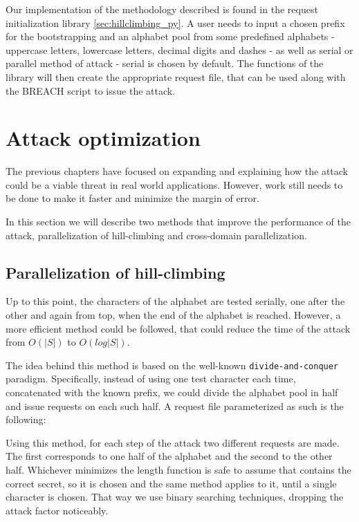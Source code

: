 Our implementation of the methodology described is found in the request
initialization library \ref{sec:hillclimbing_py}. A user needs to input a chosen
prefix for the bootstrapping and an alphabet pool from some predefined alphabets
- uppercase letters, lowercase letters, decimal digits and dashes - as well as
serial or parallel method of attack - serial is chosen by default. The
functions of the library will then create the appropriate request file, that
can be used along with the BREACH script to issue the attack.

\section{Attack optimization}\label{sec:optimization}

The previous chapters have focused on expanding and explaining how the attack
could be a viable threat in real world applications. However, work still needs
to be done to make it faster and minimize the margin of error.

In this section we will describe two methods that improve the performance of the
attack, parallelization of hill-climbing and cross-domain parallelization.

\subsection{Parallelization of hill-climbing}

Up to this point, the characters of the alphabet are tested serially, one after
the other and again from top, when the end of the alphabet is reached.  However,
a more efficient method could be followed, that could reduce the time of the
attack from \begin{math}O(|S|)\end{math} to \begin{math}O(log|S|)\end{math}.

The idea behind this method is based on the well-known
\texttt{divide-and-conquer} paradigm. Specifically, instead of using one test
character each time, concatenated with the known prefix, we could divide the
alphabet pool in half and issue requests on each such half. A request file
parameterized as such is the following:


Using this method, for each step of the attack two different requests are made.
The first corresponds to one half of the alphabet and the second to the other
half. Whichever minimizes the length function is safe to assume that contains
the correct secret, so it is chosen and the same method applies to it, until a
single character is chosen. That way we use binary searching techniques,
dropping the attack factor noticeably.

